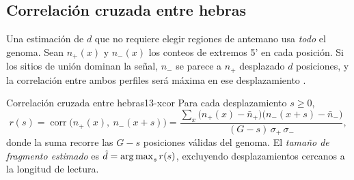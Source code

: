 \subsection{Correlación cruzada entre hebras}

Una estimación de $d$ que no requiere elegir regiones de antemano usa \emph{todo} el genoma. Sean $n_+(x)$ y $n_-(x)$ los conteos de extremos 5' en cada posición. Si los sitios de unión dominan la señal, $n_-$ se parece a $n_+$ desplazado $d$ posiciones, y la correlación entre ambos perfiles será máxima en ese desplazamiento \parencite{c13-kharchenko2008}.

\begin{definicion}{Correlación cruzada entre hebras}{13-xcor}
Para cada desplazamiento $s\ge0$,
\begin{equation}\label{eq:13-xcor}
r(s) = \operatorname{corr}\bigl(n_{+}(x),\ n_{-}(x+s)\bigr)
= \frac{\sum_x \bigl(n_+(x)-\bar n_+\bigr)\bigl(n_-(x+s)-\bar n_-\bigr)}{(G-s)\,\sigma_+\,\sigma_-},
\end{equation}
donde la suma recorre las $G-s$ posiciones válidas del genoma. El \emph{tamaño de fragmento estimado} es $\hat d=\operatorname*{arg\,max}_{s} r(s)$, excluyendo desplazamientos cercanos a la longitud de lectura.
\end{definicion}

\begin{simbolos}
\end{simbolos}

